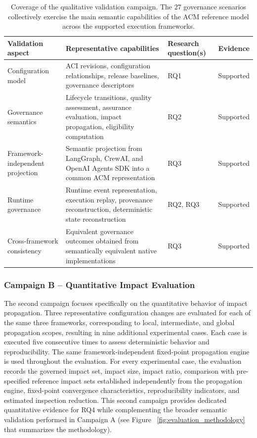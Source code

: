 \documentclass[10pt]{article}
\begin{document}
\begin{table}[t]
	\caption{Coverage of the qualitative validation campaign. The 27 governance scenarios collectively exercise the main semantic capabilities of the ACM reference model across the supported execution frameworks.}
	\label{tab:qualitative_validation}
	\centering
	\footnotesize
	\begin{tabular}{p{3.2cm}p{4.5cm}p{1.8cm}c}
		\toprule
		\textbf{Validation aspect} &
		\textbf{Representative capabilities} &
		\textbf{Research question(s)} &
		\textbf{Evidence} \\
		\midrule
		
		Configuration model
		&
		ACI revisions, configuration relationships, release baselines, governance descriptors
		&
		RQ1
		&
		Supported
		\\
		
		Governance semantics
		&
		Lifecycle transitions, quality assessment, assurance evaluation, impact propagation, eligibility computation
		&
		RQ2
		&
		Supported
		\\
		
		Framework-independent projection
		&
		Semantic projection from LangGraph, CrewAI, and OpenAI Agents SDK into a common ACM representation
		&
		RQ3
		&
		Supported
		\\
		
		Runtime governance
		&
		Runtime event representation, execution replay, provenance reconstruction, deterministic state reconstruction
		&
		RQ2, RQ3
		&
		Supported
		\\
		
		Cross-framework consistency
		&
		Equivalent governance outcomes obtained from semantically equivalent native implementations
		&
		RQ3
		&
		Supported
		\\
		
		\bottomrule
	\end{tabular}
\end{table}

\subsubsection{Campaign B -- Quantitative Impact Evaluation} The second campaign focuses specifically on the quantitative behavior of impact propagation. Three representative configuration changes are evaluated for each of the same three frameworks, corresponding to local, intermediate, and global propagation scopes, resulting in nine additional experimental cases. Each case is executed five consecutive times to assess deterministic behavior and reproducibility. The same framework-independent fixed-point propagation engine is used throughout the evaluation. For every experimental case, the evaluation records the governed impact set, impact size, impact ratio, comparison with pre-specified reference impact sets established independently from the propagation engine, fixed-point convergence characteristics, reproducibility indicators, and estimated inspection reduction. This second campaign provides dedicated quantitative evidence for RQ4 while complementing the broader semantic validation performed in Campaign A  (see Figure ~\ref{fig:evaluation_methodology} that summarizes the methodology). 
\end{document}
